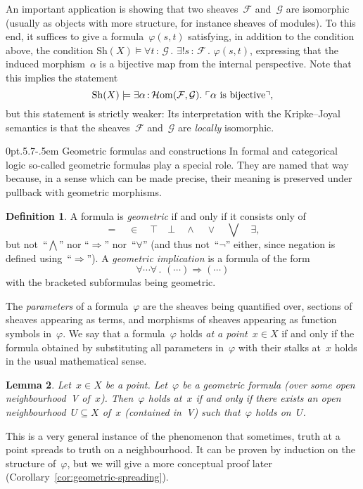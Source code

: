 \documentclass[10pt,reqno,a4paper]{amsbook}
\makeatletter
\theoremstyle{definition}
\newtheorem{defn}{Definition}[section]
\theoremstyle{plain}
\newtheorem{lemma}[defn]{Lemma}
\theoremstyle{remark}
\newcommand{\F}{\mathcal{F}}
\renewcommand{\G}{\mathcal{G}}
\newcommand{\HOM}{\mathcal{H}\mathrm{om}}
\newcommand{\Sh}{\mathrm{Sh}}
\newcommand{\?}{\,{:}\,}
\renewcommand{\_}{\mathpunct{.}\,}
\newcommand{\speak}[1]{\ulcorner\text{\textnormal{#1}}\urcorner}
\renewenvironment{proof}[1][\proofname]{\par
  \pushQED{\qed}%
  \normalfont \topsep6\p@\@plus6\p@\relax
  \trivlist
  \item[\hskip\labelsep
        \itshape
    #1\@addpunct{.}]\ignorespaces
}{%
  \popQED\endtrivlist\@endpefalse
}
\def\subsection{\@startsection{subsection}{2}%
  {0pt}{.5\linespacing\@plus.7\linespacing}{-.5em}%
  {\normalfont\bfseries}}
\makeatother
\begin{document}
An important application is showing that two sheaves~$\F$ and~$\G$ are
isomorphic (usually as objects with more structure, for instance sheaves of
modules). To this end, it suffices to give a formula~$\varphi(s,t)$ satisfying,
in addition to the condition above, the condition
$\Sh(X) \models \forall t\?\G\_ \exists! s\?\F\_ \varphi(s,t)$,
expressing that the induced morphism~$\alpha$ is a bijective map from the
internal perspective. Note that this implies the statement
\[ \Sh(X) \models \exists \alpha\?\HOM(\F,\G)\_ \speak{$\alpha$ is bijective},
\]
but this statement is strictly weaker: Its interpretation with the
Kripke--Joyal semantics is that the sheaves~$\F$ and~$\G$ are \emph{locally}
isomorphic.


\subsection{Geometric formulas and
constructions}\label{sect:geometric-formulas-and-constructions}
In formal and categorical logic so-called geometric formulas play a
special role. They are named that way because, in a sense which can be made
precise, their meaning is preserved under pullback with geometric morphisms.
\begin{defn}\label{defn:geometric-formulas}
A formula is \emph{geometric} if and only if it consists only of
\[ {=} \quad {\in} \quad {\top} \quad {\bot} \quad {\wedge} \quad {\vee} \quad
{\bigvee} \quad {\exists}, \]
but not~``$\bigwedge$'' nor ``$\Rightarrow$'' nor~``$\forall$'' (and thus
not~``$\neg$'' either, since negation is defined using~``$\Rightarrow$'').
A \emph{geometric implication} is a formula of the form
\[ \forall \cdots \forall\_ (\cdots) \Rightarrow (\cdots) \]
with the bracketed subformulas being geometric.
\end{defn}
The \emph{parameters} of a formula~$\varphi$ are the sheaves
being quantified over, sections of sheaves appearing as terms, and morphisms of
sheaves appearing as function symbols in~$\varphi$.
We say that a formula~$\varphi$ holds \emph{at a point~$x \in X$} if and only
if the formula obtained by substituting all parameters in~$\varphi$ with their
stalks at~$x$ holds in the usual mathematical sense.

\begin{lemma}\label{lemma:geometric-stalk-neighbourhood}
Let~$x \in X$ be a point. Let~$\varphi$ be a geometric formula (over some open
neighbourhood~V of~$x$).
Then~$\varphi$ holds at~$x$ if and only if there exists an open neighbourhood~$U
\subseteq X$ of~$x$ (contained in~V) such that~$\varphi$ holds on~$U$.
\end{lemma}
\begin{proof}This is a very general instance of the phenomenon that sometimes,
truth at a point spreads to truth on a neighbourhood. It can be proven by
induction on the structure of~$\varphi$, but we will give a more conceptual
proof later (Corollary~\ref{cor:geometric-spreading}).
\end{proof}
\end{document}
